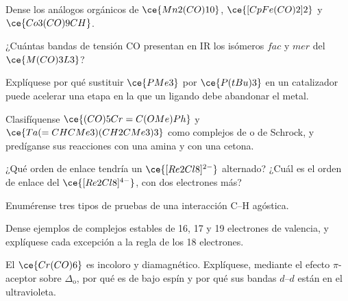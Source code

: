 \begin{exercise}[$\star$]\label{exo:b3:organometallic-bonding:4}
Dense los análogos orgánicos  de $\ce{Mn2(CO)10}$, $\ce{[CpFe(CO)2]2}$ y $\ce{Co3(CO)9CH}$.
\end{exercise}

\begin{exercise}[$\star\star$]\label{exo:b3:organometallic-bonding:5}
¿Cuántas bandas de tensión CO presentan en IR los isómeros $fac$ y $mer$ del $\ce{M(CO)3L3}$?
\end{exercise}

\begin{exercise}[$\star\star$]\label{exo:b3:organometallic-bonding:6}
Explíquese por qué sustituir $\ce{PMe3}$ por $\ce{P(tBu)3}$ en un catalizador puede acelerar una etapa en la que un
ligando debe abandonar el metal.
\end{exercise}

\begin{exercise}[$\star\star$]\label{exo:b3:organometallic-bonding:7}
Clasifíquense $\ce{(CO)5Cr=C(OMe)Ph}$ y $\ce{Ta(=CHCMe3)(CH2CMe3)3}$ como complejos de  o de
Schrock, y predíganse sus reacciones con una amina y con una cetona.
\end{exercise}

\begin{exercise}[$\star\star$]\label{exo:b3:organometallic-bonding:8}
¿Qué orden de enlace tendría un $\ce{[Re2Cl8]^{2-}}$ alternado? ¿Cuál es el orden de enlace del
$\ce{[Re2Cl8]^{4-}}$, con dos electrones más?
\end{exercise}

\begin{exercise}[$\star\star$]\label{exo:b3:organometallic-bonding:9}
Enumérense tres tipos de pruebas de una interacción C--H agóstica.
\end{exercise}

\begin{exercise}[$\star\star\star$]\label{exo:b3:organometallic-bonding:10}
Dense ejemplos de complejos estables de 16, 17 y 19 electrones de valencia, y explíquese
cada excepción a la regla de los 18 electrones.
\end{exercise}

\begin{exercise}[$\star\star\star$]\label{exo:b3:organometallic-bonding:11}
El $\ce{Cr(CO)6}$ es incoloro y diamagnético. Explíquese, mediante el efecto $\pi$-aceptor sobre $\Delta_{\mathrm o}$,
por qué es de bajo espín y por qué sus bandas $d$--$d$ están en el ultravioleta.
\end{exercise}

